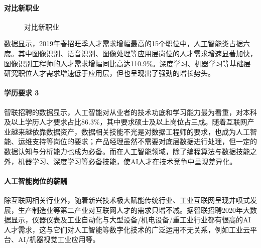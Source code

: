 \documentclass[letterpaper,10pt,english]{sphinxmanual}
\begin{document}
\paragraph{对比新职业}
\label{\detokenize{chapter_project/AI_talents:id8}}
\begin{figure}[H]
\centering
\capstart

\noindent{}
\caption{对比新职业\sphinxfootnotemark[743]}\label{\detokenize{chapter_project/AI_talents:id21}}\end{figure}
%
\begin{footnotetext}[743]\sphinxAtStartFootnote
{}
%
\end{footnotetext}\ignorespaces 
数据显示，2019年春招旺季人才需求增幅最高的15个职位中，人工智能类占据六席。其中图像识别、语音识别、图像处理等应用层岗位的人才需求增速显著加快，图像识别工程师的人才需求增幅同比高达110.9\%。深度学习、机器学习等基础层研究职位人才需求增速低于应用层，但也呈现出了强劲的增长势头。%
\begin{footnote}[744]\sphinxAtStartFootnote
{}
%
\end{footnote}


\paragraph{学历要求 3\sphinxfootnotemark[745]}
\label{\detokenize{chapter_project/AI_talents:id9}}%
\begin{footnotetext}[745]\sphinxAtStartFootnote
{}
%
\end{footnotetext}\ignorespaces 
智联招聘的数据显示，人工智能对从业者的技术功底和学习能力最为看重，对本科及以上学历人才要求占比86.3\%，其中要求硕士及以上岗位占三成。随着互联网产业越来越依靠数据资产，数据相关技能不光是对数据工程师的要求，也成为人工智能、运维支持等岗位的要求；产品经理虽然不需要对底层数据进行处理，但一定的数据认知与分析能力也成为必备。而在人工智能领域，除了编程算法与数据技能之外，机器学习、深度学习等必备技能，使AI人才在技术竞争中呈现差异化。


\paragraph{人工智能岗位的薪酬}
\label{\detokenize{chapter_project/AI_talents:id10}}
除互联网相关行业外，随着新兴技术极大赋能传统行业、工业互联网呈现井喷式发展，生产制造业等第二产业对互联网人才的需求只增不减。据智联招聘2020年大数据显示，仪器仪表及工业自动化与大型设备/机电设备/重工业行业都有很高的AI人才需求，这与它们对人工智能等数字化技术的广泛运用不无关系，例如工业云平台、AI/机器视觉工业应用等。
\end{document}
